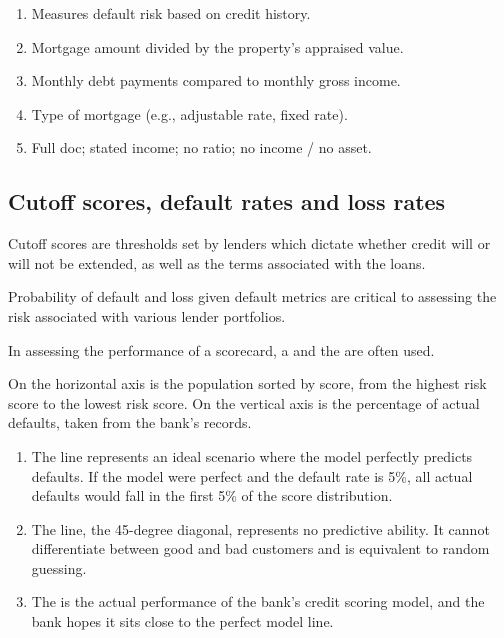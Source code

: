\begin{enumerate}[label=\alph*)]
\item {} Measures default risk based on credit history.
\item {} Mortgage amount divided by the property's
appraised value.
\item {} Monthly debt payments compared to
monthly gross income.
\item {} Type of mortgage (e.g., adjustable rate, fixed rate).
\item {} Full doc; stated income; no ratio; no income /
no asset.
\end{enumerate}

\subsection*{Cutoff scores, default rates and loss rates}

\begin{crdefbox}
Cutoff scores are thresholds set by lenders which dictate whether credit will or
will not be extended, as well as the terms associated with the loans.
\end{crdefbox}

Probability of default and loss given default metrics are critical to assessing
the risk associated with various lender portfolios.


In assessing the performance of a scorecard, a  and the  are often used.

On the horizontal axis is the population sorted by score, from the highest risk
score to the lowest risk score. On the vertical axis is the percentage of actual
defaults, taken from the bank's records.

\begin{enumerate}[label=\alph*)]
\item The  line represents an ideal scenario where the model
perfectly predicts defaults. If the model were perfect and the default rate is
5\%, all actual defaults would fall in the first 5\% of the score distribution.
\item The  line, the 45-degree diagonal, represents no
predictive ability. It cannot differentiate between good and bad customers and is
equivalent to random guessing.
\item The  is the actual performance of the bank's credit
scoring model, and the bank hopes it sits close to the perfect model line.
\end{enumerate}

